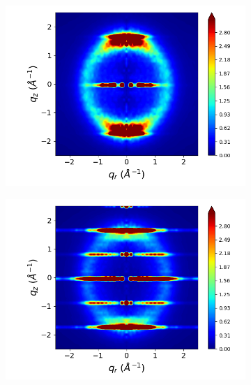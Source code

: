 \documentclass[journal=jpcbfk,manusciprt=article]{achemso}
\begin{document}
\begin{figure}[htb]
\begin{subfigure}{0.3\linewidth}
  	\includegraphics[width=\textwidth]{rotated_carboxylate_rzplot_norestraints.png}
  	\caption{}\label{fig:rotated_carboxylate_rzplot_norestraints}
  \end{subfigure}
  \begin{subfigure}{0.3\linewidth}
  	\centering
  	\includegraphics[width=\textwidth]{staggered_rzplot_norestraints.png}
  	\caption{}\label{fig:staggered_rzplot_norestraints}
  \end{subfigure}
  \begin{subfigure}{0.3\linewidth}
  	\centering

\end{subfigure}
\end{figure}
\end{document}
